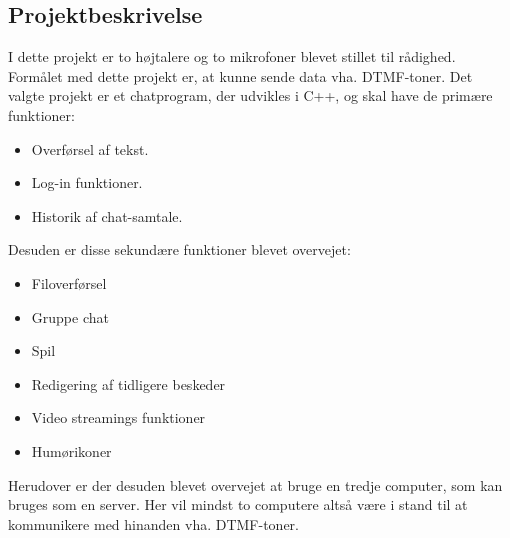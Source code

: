 \subsection{Projektbeskrivelse}
I dette projekt er to højtalere og to mikrofoner blevet stillet til rådighed. Formålet med dette projekt er, at kunne sende data vha. DTMF-toner.
\newline
Det valgte projekt er et chatprogram, der udvikles i C++, og skal have de primære funktioner:
\begin{itemize}
	\item Overførsel af tekst.
	\item Log-in funktioner.
	\item Historik af chat-samtale.
\end{itemize}
\hfill \break
Desuden er disse sekundære funktioner blevet overvejet:
\begin{itemize}
	\item Filoverførsel
	\item Gruppe chat
	\item Spil
	\item Redigering af tidligere beskeder
	\item Video streamings funktioner
	\item Humørikoner
\end{itemize}
\hfill \break
Herudover er der desuden blevet overvejet at bruge en tredje computer, som kan bruges som en server.
Her vil mindst to computere altså være i stand til at kommunikere med hinanden vha. DTMF-toner.
